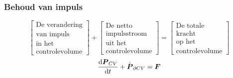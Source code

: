 \documentclass[t]{beamer}
\begin{document}
  		\begin{frame}
			\frametitle{Behoud van impuls}
			\vspace{0.7cm}
			\begin{equation*}
				\left[
					\begin{array}{c}
						\mbox{De verandering} \\ \mbox{van impuls} \\ \mbox{in het}  \\ \mbox{controlevolume}
					\end{array}
				\right]
				+
				\left[
					\begin{array}{c}
						\mbox{De netto} \\ \mbox{impulsstroom} \\ \mbox{uit het} \\ \mbox{controlevolume}
					\end{array}
				\right]
				=
				\left[
					\begin{array}{c}
						\mbox{De totale} \\ \mbox{kracht} \\ \mbox{op het} \\ \mbox{controlevolume}
					\end{array}
				\right]
				\label{eqn:controlevolume,behoud van impuls,woorden}
			\end{equation*}
			\vspace{1cm}
			\pause
			\begin{equation}
				\frac{\mathrm{d} \boldsymbol{P}_{CV}}{\mathrm{d} t} + \dot{\boldsymbol{P}}_{\partial CV} =  \boldsymbol{F}
				\label{eqn:controlevolume,behoud van impuls}
			\end{equation}
		\end{frame}	
\end{document}
